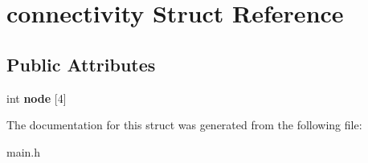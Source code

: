 \hypertarget{structconnectivity}{\section{connectivity Struct Reference}
\label{structconnectivity}
}
\subsection*{Public Attributes}
\begin{DoxyCompactItemize}
\item 
\hypertarget{structconnectivity_af0fc7c1443c916dce333bee34787cd20}{int {\bfseries node} \mbox{[}4\mbox{]}}\label{structconnectivity_af0fc7c1443c916dce333bee34787cd20}

\end{DoxyCompactItemize}


The documentation for this struct was generated from the following file\-:\begin{DoxyCompactItemize}
\item 
main.\-h\end{DoxyCompactItemize}
